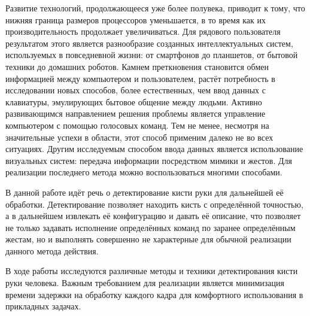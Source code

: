 Развитие технологий, продолжающееся уже более полувека, приводит к тому, что нижняя граница
размеров процессоров уменьшается, в то время как их производительность продолжает
увеличиваться. Для рядового пользователя результатом этого является разнообразие созданных
интеллектуальных систем, используемых в повседневной жизни: от смартфонов до планшетов, от
бытовой техники до домашних роботов. Камнем преткновения становится обмен информацией между
компьютером и пользователем, растёт потребность в исследовании новых способов, более 
естественных, чем ввод данных с клавиатуры, эмулирующих бытовое общение между людьми. 
Активно развивающимся направлением решения проблемы является управление компьютером с помощью 
голосовых команд. Тем не менее, несмотря на значительные успехи в области, этот способ
применим далеко не во всех ситуациях. Другим исследуемым способом ввода данных является
использование визуальных систем: передача информации посредством мимики и жестов. Для реализации
последнего метода можно воспользоваться многими способами. 

В данной работе идёт речь о детектирование кисти руки для дальнейшей её обработки.
Детектирование позволяет находить кисть с определённой точностью, а в
дальнейшем извлекать её конфигурацию и давать её описание, что позволяет не только задавать исполнение определённых 
команд по заранее определённым жестам, но и выполнять совершенно не характерные для обычной
реализации данного метода действия.

В ходе работы исследуются различные методы и техники детектирования кисти руки человека.
Важным требованием для реализации является минимизация времени
задержки на обработку каждого кадра для комфортного использования в прикладных задачах.